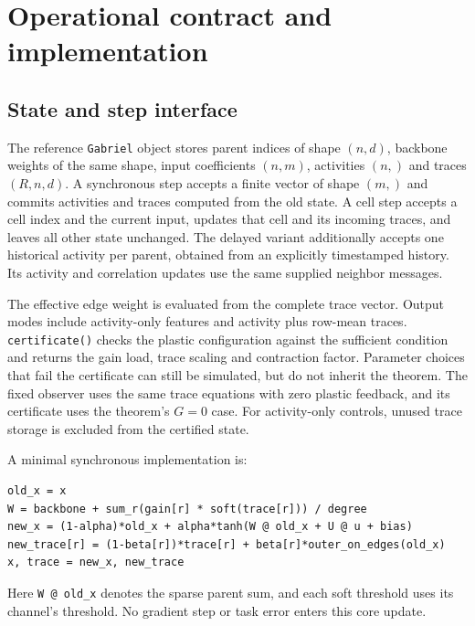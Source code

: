 \documentclass[11pt,a4paper]{article}
\theoremstyle{definition}\newtheorem{definition}[theorem]{Definition}
\begin{document}
\appendix
\section{Operational contract and implementation}
\subsection{State and step interface}
The reference \texttt{Gabriel} object stores parent indices of shape $(n,d)$, backbone weights of the same shape, input coefficients $(n,m)$, activities $(n,)$ and traces $(R,n,d)$. A synchronous step accepts a finite vector of shape $(m,)$ and commits activities and traces computed from the old state. A cell step accepts a cell index and the current input, updates that cell and its incoming traces, and leaves all other state unchanged. The delayed variant additionally accepts one historical activity per parent, obtained from an explicitly timestamped history. Its activity and correlation updates use the same supplied neighbor messages.

The effective edge weight is evaluated from the complete trace vector. Output modes include activity-only features and activity plus row-mean traces. \texttt{certificate()} checks the plastic configuration against the sufficient condition and returns the gain load, trace scaling and contraction factor. Parameter choices that fail the certificate can still be simulated, but do not inherit the theorem. The fixed observer uses the same trace equations with zero plastic feedback, and its certificate uses the theorem's $G=0$ case. For activity-only controls, unused trace storage is excluded from the certified state.

\noindent\begin{minipage}{\textwidth}
A minimal synchronous implementation is:
\begin{verbatim}
old_x = x
W = backbone + sum_r(gain[r] * soft(trace[r])) / degree
new_x = (1-alpha)*old_x + alpha*tanh(W @ old_x + U @ u + bias)
new_trace[r] = (1-beta[r])*trace[r] + beta[r]*outer_on_edges(old_x)
x, trace = new_x, new_trace
\end{verbatim}
\end{minipage}

Here \texttt{W @ old\_x} denotes the sparse parent sum, and each soft threshold uses its channel's threshold. No gradient step or task error enters this core update.
\end{document}
